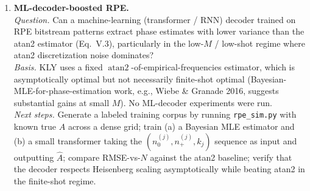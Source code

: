 \begin{enumerate}
\item \textbf{ML-decoder-boosted RPE.}\\
  \emph{Question.} Can a machine-learning (transformer / RNN) decoder
  trained on RPE bitstream patterns extract phase estimates with lower
  variance than the atan2 estimator (Eq.~V.3), particularly in the
  low-$M$ / low-shot regime where atan2 discretization noise dominates?\\
  \emph{Basis.} KLY uses a fixed
  $\operatorname{atan2}$-of-empirical-frequencies estimator, which is
  asymptotically optimal but not necessarily finite-shot optimal
  (Bayesian-MLE-for-phase-estimation work, e.g., Wiebe \& Granade 2016,
  suggests substantial gains at small $M$). No ML-decoder experiments
  were run.\\
  \emph{Next steps.} Generate a labeled training corpus by running
  \texttt{rpe\_sim.py} with known true $A$ across a dense grid; train
  (a) a Bayesian MLE estimator and (b) a small transformer taking the
  $(n_0^{(j)}, n_+^{(j)}, k_j)$ sequence as input and outputting
  $\hat A$; compare RMSE-vs-$N$ against the atan2 baseline; verify that
  the decoder respects Heisenberg scaling asymptotically while beating
  atan2 in the finite-shot regime.
\end{enumerate}
